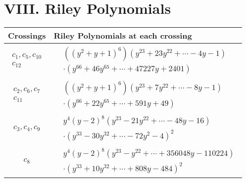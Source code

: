 \documentclass[1p]{elsarticle_modified}
\theoremstyle{definition}
\begin{document}
\centering \section*{ VIII. Riley Polynomials}
\begin{tabular}{m{50pt}|m{274pt}}
Crossings & \hspace{64pt}Riley Polynomials at each crossing \\
\hline $$\begin{aligned}c_{1},c_{5},c_{10}\\c_{12}\end{aligned}$$&$\begin{aligned}
&((y^2+y+1)^6)(y^{23}+23 y^{22}+\cdots-4 y-1)\\
&\cdot(y^{66}+46 y^{65}+\cdots+47227 y+2401)
\end{aligned}$\\
\hline $$\begin{aligned}c_{2},c_{6},c_{7}\\c_{11}\end{aligned}$$&$\begin{aligned}
&((y^2+y+1)^6)(y^{23}+7 y^{22}+\cdots-8 y-1)\\
&\cdot(y^{66}+22 y^{65}+\cdots+591 y+49)
\end{aligned}$\\
\hline $$\begin{aligned}c_{3},c_{4},c_{9}\end{aligned}$$&$\begin{aligned}
&y^4(y-2)^8(y^{23}-21 y^{22}+\cdots-48 y-16)\\
&\cdot(y^{33}-30 y^{32}+\cdots-72 y^2-4)^{2}
\end{aligned}$\\
\hline $$\begin{aligned}c_{8}\end{aligned}$$&$\begin{aligned}
&y^4(y-2)^8(y^{23}-y^{22}+\cdots+356048 y-110224)\\
&\cdot(y^{33}+10 y^{32}+\cdots+808 y-484)^{2}
\end{aligned}$\\
\hline
\end{tabular}
\vskip 2pc
\end{document}
